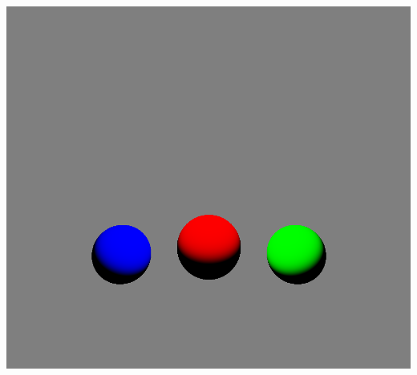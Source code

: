 \documentclass{article}
\begin{document}
\begin{center}
\includegraphics[scale=0.3]{demo-2.png}
	\end{center}
\end{document}
